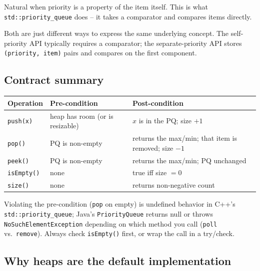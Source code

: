 \documentclass[11pt]{article}
\begin{document}
Natural when priority is a property of the item itself. This is what \texttt{std::priority\_queue} does -- it takes a comparator and compares items directly.

Both are just different ways to express the same underlying concept. The self-priority API typically requires a comparator; the separate-priority API stores \texttt{(priority, item)} pairs and compares on the first component.

\subsection*{Contract summary}

\begin{center}
\begin{tabular}{lll}
Operation & Pre-condition & Post-condition \\
\hline
\texttt{push(x)}     & heap has room (or is resizable) & $x$ is in the PQ; size $+1$ \\
\texttt{pop()}       & PQ is non-empty & returns the max/min; that item is removed; size $-1$ \\
\texttt{peek()}      & PQ is non-empty & returns the max/min; PQ unchanged \\
\texttt{isEmpty()}   & none & true iff size $= 0$ \\
\texttt{size()}      & none & returns non-negative count \\
\end{tabular}
\end{center}

Violating the pre-condition (\texttt{pop} on empty) is undefined behavior in C++'s \texttt{std::priority\_queue}; Java's \texttt{PriorityQueue} returns null or throws \texttt{NoSuchElementException} depending on which method you call (\texttt{poll} vs.\ \texttt{remove}). Always check \texttt{isEmpty()} first, or wrap the call in a try/check.

\subsection*{Why heaps are the default implementation}
\end{document}
